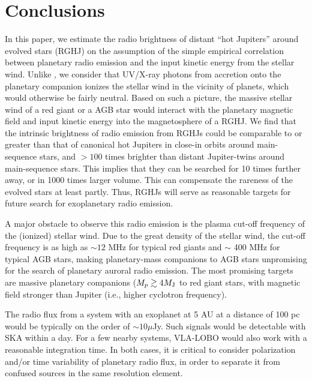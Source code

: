 \documentclass[iop,numberedappendix,apj]{emulateapj}
\begin{document}
\section{Conclusions}
\label{s:conc}

In this paper, we estimate the radio brightness of distant ``hot Jupiters'' around evolved stars (RGHJ) on the assumption of the simple empirical correlation between planetary radio emission and the input kinetic energy from the stellar wind. 
Unlike \citet{ignace2010}, we consider that UV/X-ray photons from accretion onto the planetary companion ionizes the stellar wind in the vicinity of planets, which would otherwise be fairly neutral. 
Based on such a picture, the massive stellar wind of a red giant or a AGB star would interact with the planetary magnetic field and input kinetic energy into the magnetosphere of a RGHJ. 
We find that the intrinsic brightness of radio emission from RGHJs could be comparable to or greater than that of canonical hot Jupiters in close-in orbits around main-sequence stars, and $>100$ times brighter than distant Jupiter-twins around main-sequence stars.
This implies that they can be searched for 10 times further away, or in 1000 times larger volume.
This can compensate the rareness of the evolved stars at least partly.
Thus, RGHJs will serve as reasonable targets for future search for exoplanetary radio emission. 

A major obstacle to observe this radio emission is the plasma cut-off frequency of the (ionized) stellar wind.
Due to the great density of the stellar wind, the cut-off frequency is as high as $\sim 12$ MHz for typical red giants and $\sim$ 400 MHz for typical AGB stars, making planetary-mass companions to AGB stars unpromising for the search of planetary auroral radio emission. 
The most promising targets are massive planetary companions ($M_p \gtrsim 4 M_{\rm J}$ to red giant stars, with magnetic field stronger than Jupiter (i.e., higher cyclotron frequency). 

The radio flux from a system with an exoplanet at 5 AU at a distance of 100 pc would be typically on the order of $\sim 10 \mu $Jy.
Such signals would be detectable with SKA within a day. 
For a few nearby systems, VLA-LOBO would also work with a reasonable integration time.
In both cases, it is critical to consider polarization and/or time variability of planetary radio flux, in order to separate it from confused sources in the same resolution element. 
\end{document}

